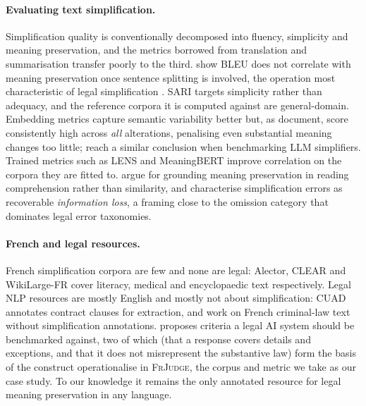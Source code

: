 \documentclass[11pt]{article}
\begin{document}
\paragraph{Evaluating text simplification.}
Simplification quality is conventionally decomposed into fluency, simplicity and
meaning preservation, and the metrics borrowed from translation and
summarisation transfer poorly to the third. \citet{sulem2018bleu} show BLEU
\citep{papineni2002bleu} does not correlate with meaning preservation once
sentence splitting is involved, the operation most characteristic of legal
simplification \citep{garimella2022text}. SARI
\citep{xu-etal-2016-optimizing} targets simplicity rather than adequacy, and the
reference corpora it is computed against \citep{alvamanchego2020asset} are
general-domain. Embedding metrics \citep{zhang2019bertscore,reimers2019sbert}
capture semantic variability better but, as \citet{cripwell2024document}
document, score consistently high across \emph{all} alterations, penalising even
substantial meaning changes too little; \citet{kew2023bless} reach a similar
conclusion when benchmarking LLM simplifiers. Trained metrics such as LENS
\citep{maddela2023lens} and MeaningBERT \citep{beauchemin2023meaningbert}
improve correlation on the corpora they are fitted to.
\citet{agrawal2024meaning} argue for grounding meaning preservation in reading
comprehension rather than similarity, and \citet{trienes2024infolossqa}
characterise simplification errors as recoverable \emph{information loss}, a
framing close to the omission category that dominates legal error taxonomies.

\paragraph{French and legal resources.}
French simplification corpora are few and none are legal: Alector, CLEAR
\citep{grabar2018clear} and WikiLarge-FR \citep{cardon2020wikilargefr} cover
literacy, medical and encyclopaedic text respectively. Legal NLP resources are
mostly English and mostly not about simplification: CUAD
\citep{hendrycks2021cuad} annotates contract clauses for extraction, and
\citet{garneau2022criminal} work on French criminal-law text without
simplification annotations. \citet{hagan2023good} proposes criteria a legal AI
system should be benchmarked against, two of which (that a response covers
details and exceptions, and that it does not misrepresent the substantive law)
form the basis of the construct \citet{beauchemin2025judgebert} operationalise
in \textsc{FrJudge}, the corpus and metric we take as our case study. To our
knowledge it remains the only annotated resource for legal meaning preservation
in any language.
\end{document}
